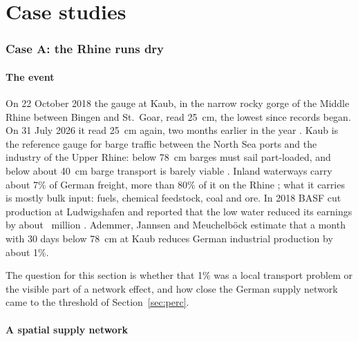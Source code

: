 \documentclass[11pt,a4paper]{article}
\theoremstyle{definition}
\theoremstyle{remark}
\begin{document}
\part{Case studies}

\section{Case A: the Rhine runs dry}
\label{sec:rhine}

\subsection{The event}

On 22 October 2018 the gauge at Kaub, in the narrow rocky gorge of the Middle Rhine between Bingen and St.~Goar, read 25~cm, the lowest since records began. On 31 July 2026 it read 25~cm again, two months earlier in the year \citep{Leinetal2026}. Kaub is the reference gauge for barge traffic between the North Sea ports and the industry of the Upper Rhine: below 78~cm barges must sail part-loaded, and below about 40~cm barge transport is barely viable \citep{KBC2022}. Inland waterways carry about 7\% of German freight, more than 80\% of it on the Rhine \citep{KBC2022}; what it carries is mostly bulk input: fuels, chemical feedstock, coal and ore. In 2018 BASF cut production at Ludwigshafen and reported that the low water reduced its earnings by about ~million \citep{BASF2019}. Ademmer, Jannsen and Meuchelb\"ock \citep{Ademmer2023} estimate that a month with 30 days below 78~cm at Kaub reduces German industrial production by about 1\%.

The question for this section is whether that 1\% was a local transport problem or the visible part of a network effect, and how close the German supply network came to the threshold of Section~\ref{sec:perc}.

\subsection{A spatial supply network}
\end{document}
